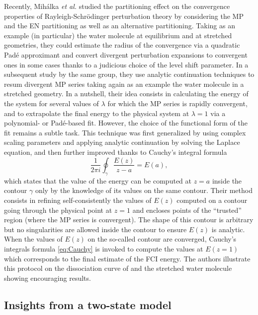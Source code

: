 \documentclass[aps,prb,reprint,noshowkeys,superscriptaddress]{revtex4-1}
\begin{document}
Recently, Mih\'alka \textit{et al.} studied the partitioning effect on the convergence properties of Rayleigh-Schr\"odinger perturbation theory by considering the MP and the EN partitioning as well as an alternative partitioning. \cite{Mihalka_2017a} 
Taking as an example (in particular) the water molecule at equilibrium and at stretched geometries, they could estimate the radius of the convergence via a quadratic Pad\'e approximant and convert divergent perturbation expansions to convergent ones in some cases thanks to a judicious choice of the level shift parameter.
In a subsequent study by the same group, \cite{Mihalka_2017b} they use analytic continuation techniques to resum divergent MP series taking again as an example the water molecule in a stretched geometry.
In a nutshell, their idea consists in calculating the energy of the system for several values of $\lambda$ for which the MP series is rapidly convergent, and to extrapolate the final energy to the physical system at $\lambda = 1$ via a polynomial- or Pad\'e-based fit. 
However, the choice of the functional form of the fit remains a subtle task.
This technique was first generalized by using complex scaling parameters and applying analytic continuation by solving the Laplace equation, \cite{Surjan_2018} and then further improved thanks to Cauchy's integral formula \cite{Mihalka_2019}
\begin{equation}
	\label{eq:Cauchy}
	\frac{1}{2\pi i} \oint_{\gamma} \frac{E(z)}{z - a} = E(a),
\end{equation}
which states that the value of the energy can be computed at $z=a$ inside the contour $\gamma$ only by the knowledge of its values on the same contour.
Their method consists in refining self-consistently the values of $E(z)$ computed on a contour going through the physical point at $z = 1$ and encloses points of the ``trusted'' region (where the MP series is convergent). The shape of this contour is arbitrary but no singularities are allowed inside the contour to ensure $E(z)$ is analytic. 
When the values of $E(z)$ on the so-called contour are converged, Cauchy's integrals formula \eqref{eq:Cauchy} is invoked to compute the values at $E(z=1)$ which corresponds to the final estimate of the FCI energy.
The authors illustrate this protocol on the dissociation curve of  and the stretched water molecule showing encouraging results. \cite{Mihalka_2019} 

\subsection{Insights from a two-state model}
\end{document}
